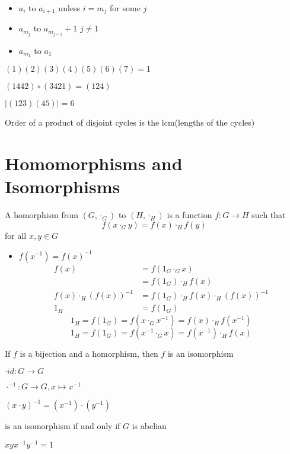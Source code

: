\begin{itemize}
  \item $a_i$ to $a_{i+1}$ unless $i = m_j$ for some $j$
  \item $a_{m_j}$ to $a_{m_{j-1}}+1$ $j \neq 1$
  \item $a_{m_1}$ to $a_1$
\end{itemize}

$(1)(2)(3)(4)(5)(6)(7) = 1$

$(1442)\circ(3421)=(124)$

$|(123)(45)|=6$

Order of a product of disjoint cycles is the lcm(lengths of the cycles)

\section{Homomorphisms and Isomorphisms}

\begin{definition}
  A homorphism from $(G, \cdot_G)$ to $(H, \cdot_H)$ is a function
  $f: G \to H$ such that $$f(x \cdot_G y) = f(x) \cdot_H f(y)$$ for all $x, y \in G$  
\end{definition}

\begin{itemize}
  \item $f(x^{-1}) = f(x)^{-1}$
  \begin{align*}
    f(x) &= f(1_G \cdot_G x) \\
    &= f(1_G) \cdot_H f(x) \\
    f(x) \cdot_H (f(x))^{-1} &= f(1_G) \cdot_H f(x) \cdot_H (f(x))^{-1} \\
    1_H &= f(1_G)
  \end{align*}
  \[1_H = f(1_G) = f(x \cdot_G x^{-1}) = f(x)\cdot_H f(x^{-1})\]
  \[1_H = f(1_G) = f(x^{-1} \cdot_G x) = f(x^{-1})\cdot_H f(x)\]
\end{itemize}

\begin{definition}
  If $f$ is a bijection and a homorphism, then $f$ is an isomorphism
\end{definition}

\begin{example}
    $\cdot id: G \to G$

    $\cdot^{-1}: G \to G, x \mapsto x^{-1}$

    $(x \cdot y)^{-1} = (x^{-1}) \cdot (y^{-1})$

    is an isomorphism if and only if $G$ is abelian

    $xyx^{-1}y^{-1} = 1$
\end{example}


